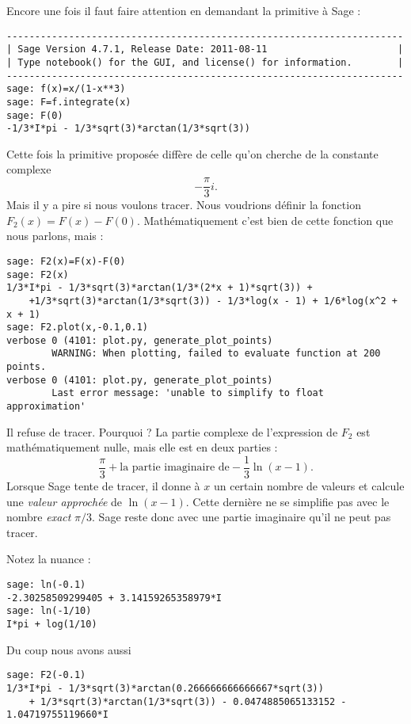 \begin{example}
Encore une fois il faut faire attention en demandant la primitive à Sage :
\begin{verbatim}
----------------------------------------------------------------------
| Sage Version 4.7.1, Release Date: 2011-08-11                       |
| Type notebook() for the GUI, and license() for information.        |
----------------------------------------------------------------------
sage: f(x)=x/(1-x**3)
sage: F=f.integrate(x)
sage: F(0)
-1/3*I*pi - 1/3*sqrt(3)*arctan(1/3*sqrt(3))
\end{verbatim}
Cette fois la primitive proposée diffère de celle qu'on cherche de la constante complexe
\begin{equation}
    -\frac{ \pi }{ 3 }i.
\end{equation}
Mais il y a pire si nous voulons tracer. Nous voudrions définir la fonction \( F_2(x)=F(x)-F(0)\). Mathématiquement c'est bien de cette fonction que nous parlons, mais :
\begin{verbatim}
sage: F2(x)=F(x)-F(0)
sage: F2(x)
1/3*I*pi - 1/3*sqrt(3)*arctan(1/3*(2*x + 1)*sqrt(3)) +
    +1/3*sqrt(3)*arctan(1/3*sqrt(3)) - 1/3*log(x - 1) + 1/6*log(x^2 + x + 1)
sage: F2.plot(x,-0.1,0.1)
verbose 0 (4101: plot.py, generate_plot_points) 
        WARNING: When plotting, failed to evaluate function at 200 points.
verbose 0 (4101: plot.py, generate_plot_points) 
        Last error message: 'unable to simplify to float approximation'
\end{verbatim}
Il refuse de tracer. Pourquoi ? La partie complexe de l'expression de \( F_2\) est mathématiquement nulle, mais elle est en deux parties :
\begin{equation}
    \frac{ \pi }{ 3 }+\text{la partie imaginaire de} -\frac{1}{ 3 }\ln(x-1).
\end{equation}
Lorsque Sage tente de tracer, il donne à \( x\) un certain nombre de valeurs et calcule une \emph{valeur approchée} de \( \ln(x-1)\). Cette dernière ne se simplifie pas avec le nombre \emph{exact} \( \pi/3\). Sage reste donc avec une partie imaginaire qu'il ne peut pas tracer.

Notez la nuance :
\begin{verbatim}
sage: ln(-0.1)
-2.30258509299405 + 3.14159265358979*I
sage: ln(-1/10)
I*pi + log(1/10)
\end{verbatim}
Du coup nous avons aussi
\begin{verbatim}
sage: F2(-0.1)
1/3*I*pi - 1/3*sqrt(3)*arctan(0.266666666666667*sqrt(3))
    + 1/3*sqrt(3)*arctan(1/3*sqrt(3)) - 0.0474885065133152 - 1.04719755119660*I
\end{verbatim}

\end{example}

